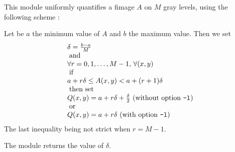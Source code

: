 This module uniformly quantifies a fimage $A$ on $M$ gray levels,
using the following scheme :

Let be $a$ the minimum value of $A$ and $b$ the maximum value.
Then we set 
\[\left. \begin{array}{l}
\delta = \frac{b-a}{M} \\
\; \mbox{and} \\ 
\forall r = 
0,1, \ldots, M-1, \, \forall (x,y) \\
\; \mbox{if} \\
a + r \delta \leq A(x,y) < a + (r+1)\delta \\
\; \mbox{then set} \\
Q(x,y) = a + r\delta + \frac{\delta}{2} \mbox{ (without option {\tt -l})}\\
\; \mbox{or} \\
Q(x,y) = a + r\delta \mbox{ (with option {\tt -l})}\\
\end{array} \right.\]
The last inequality being not strict when $r = M-1$.

The module returns the value of $\delta$.

